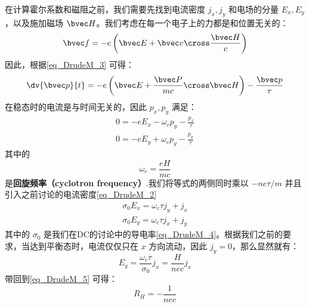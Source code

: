 在计算霍尔系数和磁阻之前，我们需要先找到电流密度 $j_x,j_y$ 和电场的分量 $E_x,E_y$，以及施加磁场 $\bvec H$。我们考虑在每一个电子上的力都是和位置无关的：
\begin{equation}
\bvec f = -e\left(\bvec E +\bvec v\cross \frac{\bvec H}{c}\right)
\end{equation}
因此，根据\autoref{eq_DrudeM_3} 可得：
\begin{equation}
\dv{\bvec p}{t}=-e\left(\bvec E +\frac{\bvec P}{mc}\cross \bvec H\right)-\frac{\bvec p}{\tau}
\end{equation}
在稳态时的电流是与时间无关的，因此 $p_x,p_y$ 满足：
\begin{align}
0=-eE_x-\omega_c p_y -\frac{p_x}{\tau}\\
0=-eE_y+\omega_c p_y -\frac{p_y}{\tau}
\end{align}
其中的
\begin{equation}
\omega_c = \frac{eH}{mc}
\end{equation}
是\textbf{回旋频率（cyclotron frequency）}.我们将等式的两侧同时乘以 $-ne\tau/m$ 并且引入之前讨论的电流密度\autoref{eq_DrudeM_2} 
\begin{align}
\sigma_0 E_x = \omega_c \tau j_y+j_x\\
\sigma_0 E_y = \omega_c \tau j_x+j_y
\end{align}
其中的 $\sigma_0$ 是我们在DC的讨论中的导电率\autoref{eq_DrudeM_4}。根据我们之前的要求，当达到平衡态时，电流仅仅只在 $x$ 方向流动，因此 $j_y = 0$，那么显然就有：
\begin{equation}
 E_y = \frac{\omega_c \tau }{\sigma_0}j_x=\frac{H}{nec}j_x
\end{equation}
带回到\autoref{eq_DrudeM_5} 可得：
\begin{equation}
R_H=-\frac{1}{nec}
\end{equation}

